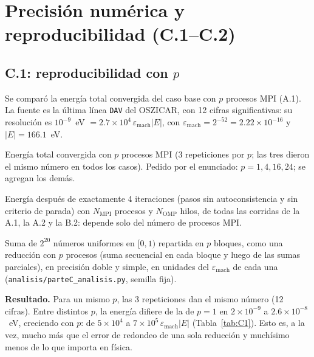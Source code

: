 \documentclass[11pt,a4paper]{article}
\newcommand{\eps}{\varepsilon_\mathrm{mach}}
\newcommand{\cod}[1]{\texttt{#1}}
\begin{document}
\section{Precisión numérica y reproducibilidad (C.1--C.2)}

\subsection{C.1: reproducibilidad con $p$}\label{sec:c1}
Se comparó la energía total convergida del caso base con $p$ procesos MPI (A.1). La fuente es la última línea
\cod{DAV} del OSZICAR, con 12 cifras significativas: su resolución es $10^{-9}$~eV
$=2.7\times10^{4}\,\eps|E|$, con $\eps=2^{-52}=2.22\times10^{-16}$ y $|E|=166.1$~eV.

\begin{table}[H]
\centering\small
\begin{adjustbox}{max width=\textwidth}\end{adjustbox}
\caption{Energía total convergida con $p$ procesos MPI (3 repeticiones por $p$; las tres dieron el mismo
número en todos los casos). Pedido por el enunciado: $p=1,4,16,24$; se agregan los demás.}
\label{tab:C1}
\end{table}

\begin{table}[H]
\centering\small
\begin{adjustbox}{max width=\textwidth}\end{adjustbox}
\caption{Energía después de exactamente 4 iteraciones (pasos sin autoconsistencia y sin criterio de parada)
con $N_\mathrm{MPI}$ procesos y $N_\mathrm{OMP}$ hilos, de todas las corridas de la A.1, la A.2 y la B.2:
depende solo del número de procesos MPI.}
\label{tab:C1b}
\end{table}

\begin{table}[H]
\centering\small

\caption{Suma de $2^{20}$ números uniformes en $[0,1)$ repartida en $p$ bloques, como una reducción con $p$
procesos (suma secuencial en cada bloque y luego de las sumas parciales), en precisión doble y simple, en
unidades del $\eps$ de cada una (\cod{analisis/parteC\_analisis.py}, semilla fija).}
\label{tab:C1c}
\end{table}

\textbf{Resultado.} Para un mismo $p$, las 3 repeticiones dan el mismo número (12 cifras). Entre distintos $p$,
la energía difiere de la de $p=1$ en $2\times10^{-9}$ a $2.6\times10^{-8}$~eV, creciendo con $p$: de
$5\times10^{4}$ a $7\times10^{5}\,\eps|E|$ (Tabla~\ref{tab:C1}). Esto es, a la vez, mucho más que el error de
redondeo de una sola reducción y muchísimo menos de lo que importa en física.
\end{document}
